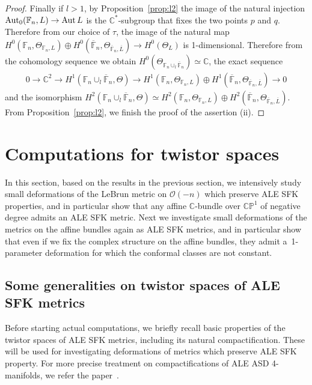 \documentclass[11pt]{article}
\numberwithin{equation}{section}
\DeclareMathOperator{\Aut}{Aut}
\begin{document}
\begin{proof}
Finally if $l>1$, by Proposition~\ref{prop:l2} the image of the natural injection ${\rm{Aut}}_0(\mathbb{F}_n,L)\to \Aut
L$ is the $\mathbb{C}^*$-subgroup that f\/ixes the two points $p$ and $q$.
Therefore from our choice of $\tau$, the image of the natural map $H^0(\mathbb{F}_n, \Theta_{\mathbb{F}_n,L}) \oplus H^0
(\overline{\mathbb{F}}_n,\Theta_{\overline{\mathbb{F}}_n,\overline L})\to H^0(\Theta_L)$ is 1-dimensional.
Therefore from the cohomology sequence we obtain $H^0(\Theta_{\mathbb{F}_n\cup_l\overline{\mathbb{F}}_n})
\simeq\mathbb{C}$, the exact sequence
\begin{gather*}
0
\longrightarrow
\mathbb{C}^2
\longrightarrow
H^1 (\mathbb{F}_n \cup_l \overline{\mathbb{F}}_n,\Theta)
\longrightarrow
H^1(\mathbb{F}_n, \Theta_{\mathbb{F}_n,L}) \oplus H^1
(\overline{\mathbb{F}}_n,\Theta_{\overline{\mathbb{F}}_n,\overline L})
\longrightarrow
0
\end{gather*}
and the isomorphism $H^2 (\mathbb{F}_n \cup_l \overline{\mathbb{F}}_n,\Theta) \simeq H^2(\mathbb{F}_n,
\Theta_{\mathbb{F}_n,L}) \oplus H^2 (\overline{\mathbb{F}}_n,\Theta_{\overline{\mathbb{F}}_n,\overline L})$.
From Proposition~\ref{prop:l2}, we f\/inish the proof of the assertion (ii).
\end{proof}

\section{Computations for twistor spaces}
\label{explicit}

In this section, based on the results in the previous section, we intensively study small deformations of the LeBrun
metric on $\mathscr O(-n)$ which preserve ALE SFK properties, and in particular show that any af\/f\/ine
$\mathbb{C}$-bundle over $\mathbb{CP}^1$ of negative degree admits an ALE SFK metric.
Next we investigate small deformations of the metrics on the af\/f\/ine bundles again as ALE SFK metrics, and in
particular show that even if we f\/ix the complex structure on the af\/f\/ine bundles, they admit a~1-parameter
deformation for which the conformal classes are not constant.

\subsection{Some generalities on twistor spaces of ALE SFK metrics} %

Before starting actual computations, we brief\/ly recall basic properties of the twistor spaces of ALE SFK metrics,
including its natural compactif\/ication.
These will be used for investigating deformations of metrics which preserve ALE SFK property.
For more precise treatment on compactif\/ications of ALE ASD 4-manifolds, we refer the paper~\cite{V}.
\end{document}
